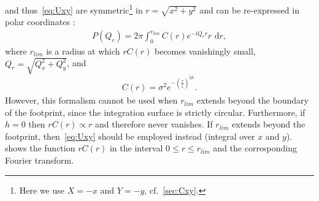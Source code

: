 \documentclass[10pt,twoside, b5paper,pdftex]{report}
\begin{document}
 and thus~\cref{eq:Uxy} are symmetric\footnote{Here we use $X = -x$ and $Y = -y$, cf.~\cref{sec:Cxy}.} in $r = \sqrt{x^2+y^2}$   and can be re-expressed in polar coordinates :
\begin{align}
 	 P(Q_{r}) = 2\pi \int^{r_{lim}}_{0}C(r)  e^{-iQ_{r}r} r \mbox{ d}r ,\label{eq:Ur}
\end{align} 
where   $r_{lim}$ is a radius at which $rC(r)$ becomes vanishingly small, $Q_{r} = \sqrt{Q_{x}^2 + Q_{y}^2}$, and
\begin{align}
 	 C(r) = \sigma^2 e^{-(\frac{r}{\zeta})^{2h}}.
\end{align} 
However, this formalism cannot be used when $r_{lim}$  extends beyond the boundary of the footprint, since the integration surface is strictly circular. Furthermore, if $h = 0$ then $rC(r) \propto r$ and therefore never vanishes. If $r_{lim}$ extends beyond the footprint, then~\cref{eq:Uxy} should be employed instead (integral over $x$ and $y$).  shows the function $rC(r)$ in the interval $0 \leq r \leq r_{lim}$ and the corresponding Fourier transform.
\end{document}
